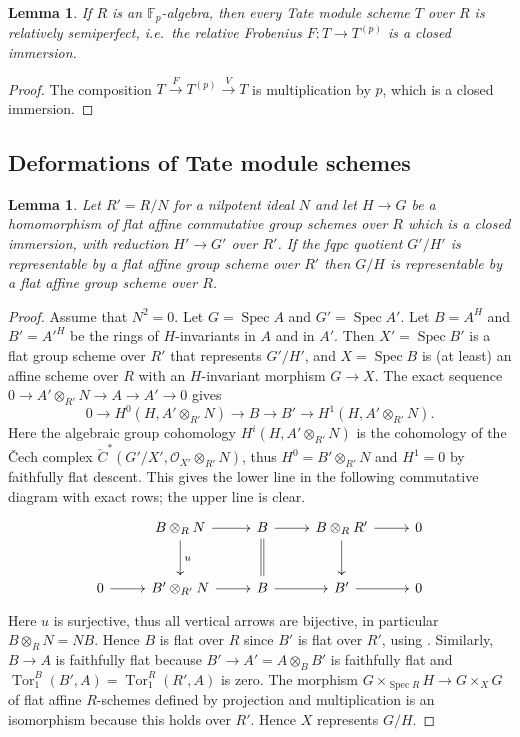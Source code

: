 \documentclass[a4paper,11pt]{amsart}
\theoremstyle{plain}
\newtheorem{Lemma}[equation]{Lemma}
\theoremstyle{definition}
\theoremstyle{remark}
\newcommand{\bLe}{\begin{Lemma}}
\newcommand{\eLe}{\end{Lemma}}
\newcommand{\bproof}{\begin{proof}}
\newcommand{\eproof}{\end{proof}}
\numberwithin{equation}{section}
\newcommand{\OOO}{\mathcal{O}}
\newcommand{\FF}{{\mathbb{F}}}
\DeclareMathOperator{\Spec}{Spec}
\DeclareMathOperator{\Tor}{Tor}
\begin{document}
\bLe 
If $R$ is an $\FF_p$-algebra, then every Tate module scheme $T$ over $R$ is relatively semiperfect, i.e.\ the relative Frobenius $F\colon T\to T^{(p)}$ is a closed immersion.
\eLe

\bproof
The composition $T\xrightarrow FT^{(p)}\xrightarrow V T$ is multiplication by $p$, which is a closed immersion.
\eproof

\subsection{Deformations of Tate module schemes}

\bLe
\label{Le:deform-quotient}
Let $R'=R/N$ for a nilpotent ideal $N$ and let $H\to G$ be a homomorphism of flat affine commutative group schemes over $R$ which is a closed immersion, with reduction $H'\to G'$ over $R'$. If the fqpc quotient $G'/H'$ is representable by a flat affine group scheme over $R'$ then $G/H$ is representable by a flat affine group scheme over $R$.
\eLe

\bproof
Assume that $N^2=0$.
Let $G=\Spec A$ and $G'=\Spec A'$. 
Let $B=A^H$ and $B'=A'^H$ be the rings of $H$-invariants in $A$ and in $A'$.
Then $X'=\Spec B'$ is a flat group scheme over $R'$ that represents $G'/H'$, and $X=\Spec B$ is (at least) an affine scheme over $R$ with an $H$-invariant morphism $G\to X$.
The exact sequence $0\to A'\otimes_{R'}N\to A\to A'\to 0$ gives
\[
0\to H^0(H,A'\otimes_{R'}N)\to B\to B'\to H^1(H,A'\otimes_{R'}N).
\]
 Here 
the algebraic group cohomology $H^i(H,A'\otimes_{R'}N)$ is the cohomology of the \v Cech complex $\check C^*(G'/X',\OOO_{X'}\otimes_{R'}N)$, thus $H^0=B'\otimes_{R'}N$ and $H^1=0$ by faithfully flat descent. This gives the lower line in the following commutative diagram with exact rows; 
the upper line is clear.
\[
\xymatrix@M+0.2em{
& B\otimes_{R}N \ar[r] \ar[d]^u & B \ar[r] \ar@{=}[d] & B\otimes_RR' \ar[r] \ar[d] & 0 \\
0 \ar[r] & B'\otimes_{R'}N \ar[r] & B \ar[r] & B' \ar[r] & 0 
}
\]
Here $u$ is surjective, thus all vertical arrows are bijective, 
in particular $B\otimes_RN=NB$. Hence $B$ is flat over $R$ since $B'$ is flat over $R'$, using \cite[Theorem 22.3]{Matsumura:Commutative}. Similarly, $B\to A$ is faithfully flat because $B'\to A'=A\otimes_BB'$ is faithfully flat and $\Tor_1^B(B',A)=\Tor_1^R(R',A)$ is zero. The morphism $G\times_{\Spec R} H\to G\times_XG$ of flat affine $R$-schemes defined by projection and multiplication is an isomorphism because this holds over $R'$. Hence $X$ represents $G/H$.
\eproof
\end{document}
